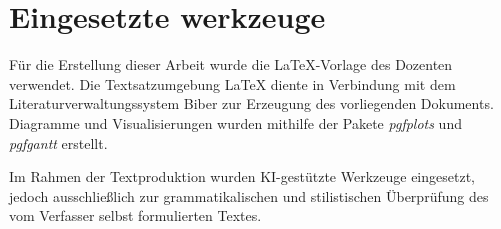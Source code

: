 \section{Eingesetzte werkzeuge}

Für die Erstellung dieser Arbeit wurde die \LaTeX-Vorlage des Dozenten verwendet. Die Textsatzumgebung \LaTeX{} diente in Verbindung mit dem Literaturverwaltungssystem Biber zur Erzeugung des vorliegenden Dokuments. Diagramme und Visualisierungen wurden mithilfe der Pakete \textit{pgfplots} und \textit{pgfgantt} erstellt.

Im Rahmen der Textproduktion wurden KI-gestützte Werkzeuge eingesetzt, jedoch ausschließlich zur grammatikalischen und stilistischen Überprüfung des vom Verfasser selbst formulierten Textes.
